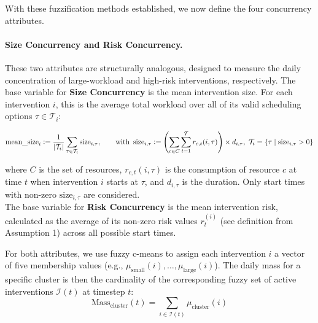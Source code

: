 With these fuzzification methods established, we now define the four concurrency attributes.

\paragraph{Size Concurrency and Risk Concurrency.}
These two attributes are structurally analogous, designed to measure the daily concentration of large-workload and high-risk interventions, respectively. The base variable for \textbf{Size Concurrency} is the mean intervention size. For each intervention $i$, this is the average total workload over all of its valid scheduling options $\tau \in \mathcal{T}_i$:

\[
    \text{mean\_size}_i \mathrel{\mathop:}= \frac{1}{|\mathcal{T}_i|} \sum_{\tau\in \mathcal{T}_i} \text{size}_{i,\tau},
    \qquad \text{with }\,
    \text{size}_{i,\tau} \mathrel{\mathop:}= \left(\sum_{c \in C} \sum_{t=1}^{\mathcal{T}} r_{c,t}(i,\tau)\right) \times d_{i,\tau}, \,\, \mathcal{T}_i = \{ \tau \mid \text{size}_{i,\tau} > 0 \}
\]

where \(C\) is the set of resources, \(r_{c,t}(i,\tau)\) is the consumption of resource \(c\) at time \(t\) when intervention \(i\) starts at \(\tau\), and \(d_{i,\tau}\) is the duration. Only start times with non-zero \(\text{size}_{i,\tau}\) are considered. \\
The base variable for \textbf{Risk Concurrency} is the mean intervention risk, calculated as the average of its non-zero risk values $r_t^{(i)}$ (see definition from Assumption 1) across all possible start times. 

For both attributes, we use fuzzy c-means to assign each intervention $i$ a vector of five membership values (e.g., $\mu_{\text{small}}(i), \dots, \mu_{\text{large}}(i)$). The daily mass for a specific cluster is then the cardinality of the corresponding fuzzy set of active interventions $\mathcal{I}(t)$ at timestep $t$:
\[
    \text{Mass}_{\text{cluster}}(t) = \sum_{i \in \mathcal{I}(t)} \mu_{\text{cluster}}(i)
\]


    
    


